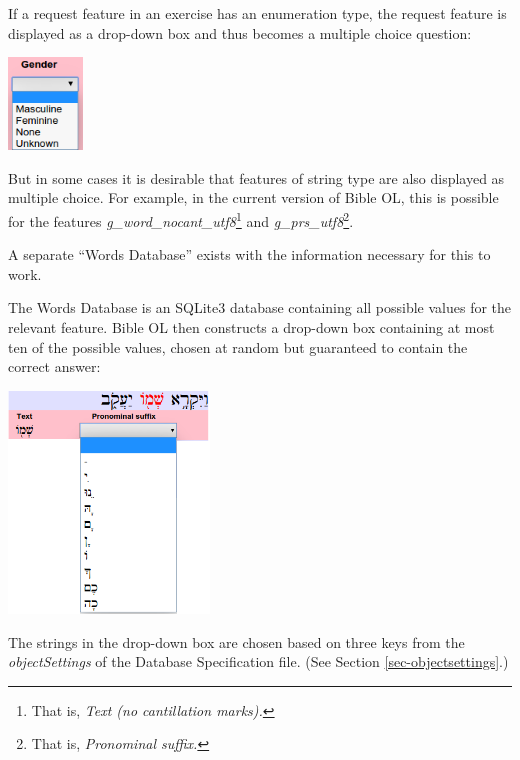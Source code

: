 \documentclass[11pt,oneside,a4paper]{memoir}
\begin{document}
If a request feature in an exercise has an
enumeration type, the request feature is displayed as a drop-down box and
thus becomes a multiple choice question:

\begin{center}
  \includegraphics[width=0.148\textwidth]{gender.png}
\end{center}

But in some cases it is desirable that features of string type are also displayed as multiple
choice. For example, in the current version of Bible OL, this is possible for the features
\emph{g\_word\_nocant\_utf8}\footnote{That is, \emph{Text (no cantillation marks).}} and
\emph{g\_prs\_utf8}\footnote{That is, \emph{Pronominal suffix.}}.

A separate ``Words Database'' exists with the information necessary for this to work.

The Words Database is an SQLite3 database containing all possible values for the relevant feature.
Bible OL then constructs a drop-down box containing at most ten of the possible values, chosen at
random but guaranteed to contain the correct answer:

\begin{center}
  \includegraphics[width=0.4\textwidth]{pronsuf.png}
\end{center}

The strings in the drop-down box are chosen based on three keys from the \emph{objectSettings} of
the Database Specification file. (See Section \ref{sec-objectsettings}.)
\end{document}
